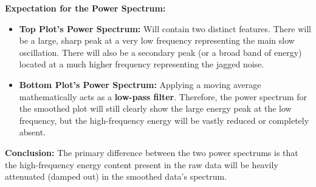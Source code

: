 \documentclass[11pt]{article}
\begin{document}
\textbf{Expectation for the Power Spectrum:}
\begin{itemize}
\item \textbf{Top Plot's Power Spectrum:} Will contain two distinct features. There will be a large, sharp peak at a very low frequency representing the main slow oscillation. There will also be a secondary peak (or a broad band of energy) located at a much higher frequency representing the jagged noise.
\item \textbf{Bottom Plot's Power Spectrum:} Applying a moving average mathematically acts as a \textbf{low-pass filter}. Therefore, the power spectrum for the smoothed plot will still clearly show the large energy peak at the low frequency, but the high-frequency energy will be vastly reduced or completely absent.
\end{itemize}

\textbf{Conclusion:} The primary difference between the two power spectrums is that the high-frequency energy content present in the raw data will be heavily attenuated (damped out) in the smoothed data's spectrum.
\end{document}
